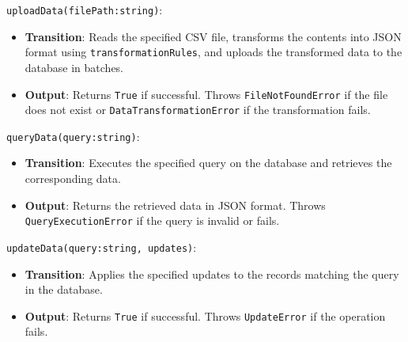 \documentclass[12pt, titlepage]{article}
\begin{document}
\begin{description}
\begin{description}
  \texttt{uploadData(filePath:string)}:
  \item
  \begin{itemize}
    \item \textbf{Transition}: Reads the specified CSV file, transforms the contents into
    JSON format using \texttt{transformationRules}, and uploads the transformed data to
    the database in batches.
  \end{itemize}
  \item
  \begin{itemize}
    \item \textbf{Output}: Returns \texttt{True} if successful. Throws \texttt{FileNotFoundError}
    if the file does not exist or \texttt{DataTransformationError} if the transformation fails.
  \end{itemize}
  \item

  \texttt{queryData(query:string)}:
  \item
  \begin{itemize}
    \item \textbf{Transition}: Executes the specified query on the database and retrieves the
    corresponding data.
  \end{itemize}
  \item 
  \begin{itemize}
    \item \textbf{Output}: Returns the retrieved data in JSON format. Throws \texttt{QueryExecutionError}
    if the query is invalid or fails.
  \end{itemize}
  \item

  \texttt{updateData(query:string, updates)}:
  \item
  \begin{itemize}
    \item \textbf{Transition}: Applies the specified updates to the records matching the query
    in the database.
  \end{itemize}
  \item
  \begin{itemize}
    \item \textbf{Output}: Returns \texttt{True} if successful. Throws \texttt{UpdateError}
    if the operation fails.
  \end{itemize}
  \item


\end{description}
\end{description}
\end{document}
